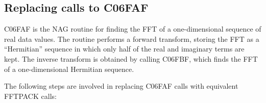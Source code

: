 \documentclass[11pt,twoside,nolof]{starlink}
\begin{document}

\subsection{Replacing calls to C06FAF}

   C06FAF is the NAG routine for finding the FFT of a one-dimensional
   sequence of real data values. The routine performs a forward
   transform, storing the FFT as a ``Hermitian'' sequence in which only
   half of the real and imaginary terms are kept. The inverse transform
   is obtained by calling C06FBF, which finds the FFT of a one-dimensional
   Hermitian sequence.

   The following steps are involved in replacing C06FAF calls with
   equivalent FFTPACK calls:
\end{document}
